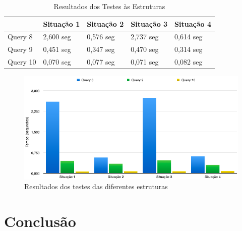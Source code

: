 \documentclass[10pt] {article}
\begin{document}
\newpage

\begin{table}[h]
\centering
\caption{Resultados dos Testes às Estruturas}
\begin{tabular}{l|l|l|l|l|}
\cline{2-5}
                               & Situação 1 & Situação 2 & Situação 3 & Situação 4 \\ \hline
\multicolumn{1}{|l|}{Query 8}  & 2,600 seg  & 0,576 seg  & 2,737 seg  & 0,614 seg  \\ \hline
\multicolumn{1}{|l|}{Query 9}  & 0,451 seg  & 0,347 seg  & 0,470 seg  & 0,314 seg  \\ \hline
\multicolumn{1}{|l|}{Query 10} & 0,070 seg  & 0,077 seg  & 0,071 seg  & 0,082 seg  \\ \hline
\end{tabular}
\end{table}

\begin{figure}[ht!]
\centering
\includegraphics[width=150mm]{graphstruct.png}
\caption{Resultados dos testes das diferentes estruturas}
\label{fig:sales}
\end{figure}

\section{Conclusão}
\end{document}
